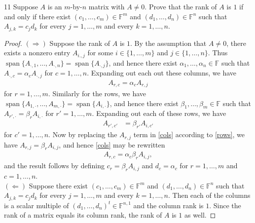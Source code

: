 \documentclass[11pt]{extarticle}
\newenvironment{problem}[1]{\begin{prob*}{#1}{}}{\end{prob*}}
\newcommand{\F}{\mathbb{F}}
\DeclareMathOperator{\Span}{span}
\begin{document}
\begin{problem}{11}
Suppose $A$ is an $m$-by-$n$ matrix with $A\neq 0$.  Prove that the rank of $A$ is $1$ if and only if there exist $(c_1,\dots,c_m)\in\F^m$ and $(d_1,\dots,d_n)\in\F^n$ such that $A_{j,k}=c_jd_k$ for every $j=1,\dots,m$ and every $k=1,\dots,n$.
\end{problem}
\begin{proof}
$(\Rightarrow)$ Suppose the rank of $A$ is $1$.  By the assumption that $A\neq 0$, there exists a nonzero entry $A_{i.,j}$ for some $i\in\{1,\dots,m\}$ and $j\in\{1,\dots,n\}$.  Thus $\Span\{A_{\cdot, 1},\dots, A_{\cdot, n}\}= \Span\{A_{\cdot, j}\}$, and hence there exist $\alpha_1,\dots, \alpha_n\in\F$ such that $A_{\cdot, c} = \alpha_cA_{\cdot, j}$ for $c = 1,\dots, n$.  Expanding out each out these columns, we have
\begin{align}\label{cols}
A_{r,c} = \alpha_c A_{r, j}
\end{align}
for $r = 1,\dots,m$.  Similarly for the rows, we have $\Span\{A_{1, \cdot},\dots, A_{m, \cdot}\}= \Span\{A_{i, \cdot}\}$, and hence there exist $\beta_1,\dots, \beta_m\in\F$ such that $A_{r',\cdot} = \beta_r A_{i,\cdot}$ for $r' = 1,\dots,m$.  Expanding out each of these rows, we have
\begin{align}\label{rows}
A_{r', c'} &= \beta_{r'} A_{i, c'}
\end{align}
for $c' = 1,\dots, n$.  Now by replacing the $A_{r, j}$ term in \eqref{cols} according to \eqref{rows}, we have $A_{r,j} =  \beta_rA_{i,j}$, and hence \eqref{cols} may be rewritten
\begin{align*}
A_{r,c} = \alpha_c\beta_r A_{i,j},
\end{align*}
and the result follows by defining $c_r = \beta_rA_{i,j}$ and $d_c = \alpha_c$ for $r=  1,\dots, m$ and $c = 1,\dots, n$.\\
\indent $(\Leftarrow)$ Suppose there exist $(c_1,\dots,c_m)\in\F^m$ and $(d_1,\dots,d_n)\in\F^n$ such that $A_{j,k}=c_jd_k$ for every $j=1,\dots,m$ and every $k=1,\dots,n$.  Then each of the columns is a scalar multiple of $(d_1,\dots,d_n)^t\in\F^{n,1}$ and the column rank is $1$.  Since the rank of a matrix equals its column rank, the rank of $A$ is $1$ as well.
\end{proof}
\end{document}
